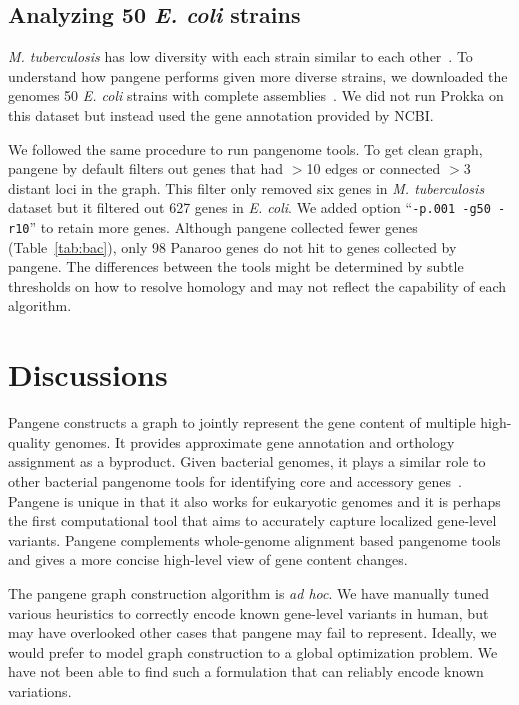 \documentclass[webpdf,contemporary,large,namedate]{oup-authoring-template}%
\begin{document}
\subsection{Analyzing 50 \textit{E. coli} strains}

\emph{M. tuberculosis} has low diversity with each strain similar to each other~\citep{Marin:2022aa}.
To understand how pangene performs given more diverse strains,
we downloaded the genomes 50 \emph{E. coli} strains with complete assemblies~\citep{Shaw:2021aa}.
We did not run Prokka on this dataset but instead used the gene annotation provided by NCBI.

We followed the same procedure to run pangenome tools.
To get clean graph, pangene by default filters out genes that had $>$10 edges or connected $>$3 distant loci in the graph.
This filter only removed six genes in \emph{M. tuberculosis} dataset but
it filtered out 627 genes in \emph{E. coli}.
We added option ``{\tt -p.001 -g50 -r10}'' to retain more genes.
Although pangene collected fewer genes (Table~\ref{tab:bac}),
only 98 Panaroo genes do not hit to genes collected by pangene.
The differences between the tools might be determined by subtle thresholds on how to resolve homology
and may not reflect the capability of each algorithm.

\section{Discussions}

Pangene constructs a graph to jointly represent the gene content of multiple high-quality genomes.
It provides approximate gene annotation and orthology assignment as a byproduct.
Given bacterial genomes, it plays a similar role to other bacterial pangenome tools
for identifying core and accessory genes~\citep{Tonkin-Hill:2023aa}.
Pangene is unique in that it also works for eukaryotic genomes
and it is perhaps the first computational tool that aims to accurately capture localized gene-level variants.
Pangene complements whole-genome alignment based pangenome tools
and gives a more concise high-level view of gene content changes.

The pangene graph construction algorithm is \emph{ad hoc}.
We have manually tuned various heuristics to correctly encode known gene-level variants in human,
but may have overlooked other cases that pangene may fail to represent.
Ideally, we would prefer to model graph construction to a global optimization problem.
We have not been able to find such a formulation that can reliably encode known variations.
\end{document}
